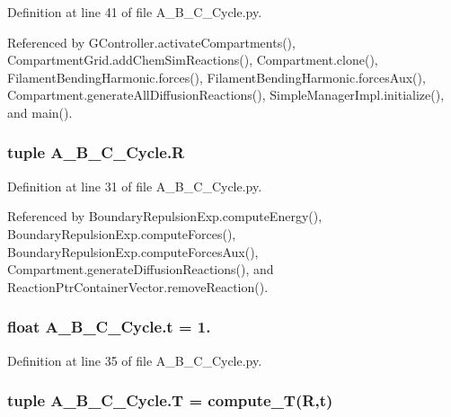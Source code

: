 Definition at line 41 of file A\+\_\+\+B\+\_\+\+C\+\_\+\+Cycle.\+py.



Referenced by G\+Controller.\+activate\+Compartments(), Compartment\+Grid.\+add\+Chem\+Sim\+Reactions(), Compartment.\+clone(), Filament\+Bending\+Harmonic.\+forces(), Filament\+Bending\+Harmonic.\+forces\+Aux(), Compartment.\+generate\+All\+Diffusion\+Reactions(), Simple\+Manager\+Impl.\+initialize(), and main().

\hypertarget{namespaceA__B__C__Cycle_a23b7c1024d319feae9e3a687526aeb94}{
\subsubsection[{R}]{\setlength{\rightskip}{0pt plus 5cm}tuple A\+\_\+\+B\+\_\+\+C\+\_\+\+Cycle.\+R}}\label{namespaceA__B__C__Cycle_a23b7c1024d319feae9e3a687526aeb94}


Definition at line 31 of file A\+\_\+\+B\+\_\+\+C\+\_\+\+Cycle.\+py.



Referenced by Boundary\+Repulsion\+Exp.\+compute\+Energy(), Boundary\+Repulsion\+Exp.\+compute\+Forces(), Boundary\+Repulsion\+Exp.\+compute\+Forces\+Aux(), Compartment.\+generate\+Diffusion\+Reactions(), and Reaction\+Ptr\+Container\+Vector.\+remove\+Reaction().

\hypertarget{namespaceA__B__C__Cycle_ab55624a349d5a1ba164d1dde7d24524d}{
\subsubsection[{t}]{\setlength{\rightskip}{0pt plus 5cm}float A\+\_\+\+B\+\_\+\+C\+\_\+\+Cycle.\+t = 1.}}\label{namespaceA__B__C__Cycle_ab55624a349d5a1ba164d1dde7d24524d}


Definition at line 35 of file A\+\_\+\+B\+\_\+\+C\+\_\+\+Cycle.\+py.

\hypertarget{namespaceA__B__C__Cycle_af487b8de68dc3e23fe5f16f3580525a7}{
\subsubsection[{T}]{\setlength{\rightskip}{0pt plus 5cm}tuple A\+\_\+\+B\+\_\+\+C\+\_\+\+Cycle.\+T = {\bf compute\+\_\+\+T}({\bf R},{\bf t})}}\label{namespaceA__B__C__Cycle_af487b8de68dc3e23fe5f16f3580525a7}


